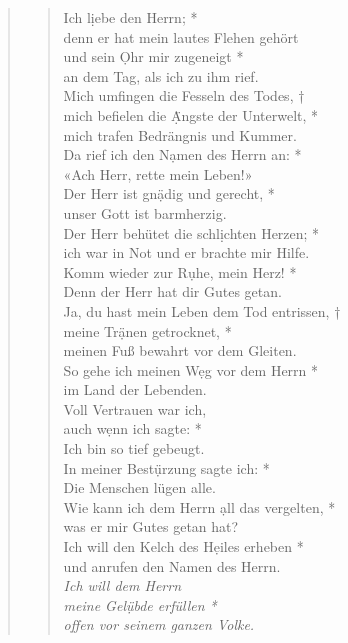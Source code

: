 \begin{quote}
\begin{verse}
Ich l\d iebe den Herrn; *\\ 
denn er hat mein lautes Flehen gehört\\ 
\vin und sein \d Ohr mir zugeneigt *\\ 
\vin an dem Tag, als ich zu ihm rief.\\ 
Mich umfingen die Fesseln des Todes, †\\
mich befielen die \d Ängste der Unterwelt, *\\  
mich trafen Bedrängnis und Kummer.\\ 
\vin Da rief ich den N\d amen des Herrn an: *\\ 
\vin «Ach Herr, rette mein Leben!»\\
Der Herr ist gn\d ädig und gerecht, *\\ 
unser Gott ist barmherzig.\\ 
\vin Der Herr behütet die schl\d ichten Herzen; *\\ 
\vin ich war in Not und er brachte mir Hilfe.\\ 
Komm wieder zur R\d uhe, mein Herz! *\\ 
Denn der Herr hat dir Gutes getan.\\ 
\vin Ja, du hast mein Leben dem Tod entrissen, †\\ 
\vin meine Tr\d änen getrocknet, *\\ 
\vin  meinen Fuß bewahrt vor dem Gleiten.\\  
So gehe ich meinen W\d eg vor dem Herrn *\\ 
im Land der Lebenden.\\ 
\vin Voll Vertrauen war ich,\\ 
\vin auch w\d enn ich sagte: *\\ 
\vin Ich bin so tief gebeugt.\\ 
In meiner Best\d ürzung sagte ich: *\\ 
Die Menschen lügen alle.\\ 
\vin Wie kann ich dem Herrn \d all das vergelten, *\\ 
\vin was er mir Gutes getan hat?\\
Ich will den Kelch des H\d eiles erheben *\\ 
und anrufen den Namen des Herrn.\\ 
\vin \textit{Ich will dem Herrn\\ 
\vin meine Gel\d übde erfüllen *\\ 
\vin offen vor seinem ganzen Volke.}\\ 

\end{verse}
\end{quote}
